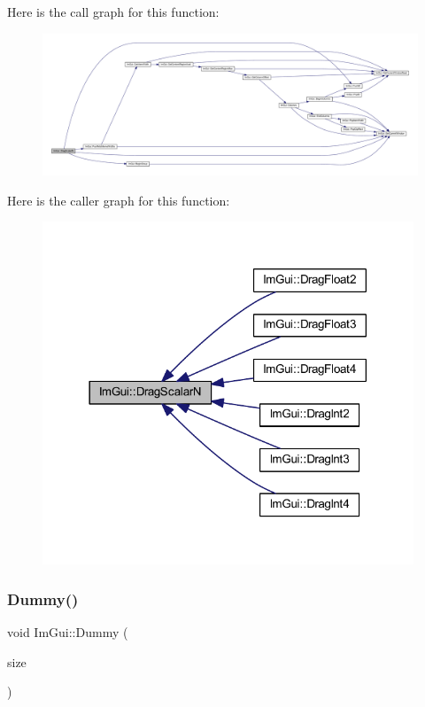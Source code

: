Here is the call graph for this function\+:
\nopagebreak
\begin{figure}[H]
\begin{center}
\leavevmode
\includegraphics[width=350pt]{namespace_im_gui_a8772a7febac2b035d3f2f240f7e7c2e9_cgraph}
\end{center}
\end{figure}
Here is the caller graph for this function\+:
\nopagebreak
\begin{figure}[H]
\begin{center}
\leavevmode
\includegraphics[width=314pt]{namespace_im_gui_a8772a7febac2b035d3f2f240f7e7c2e9_icgraph}
\end{center}
\end{figure}
\mbox{\label{namespace_im_gui_a8b0fb07113251301ff897b8578a53f34}} 
\subsubsection{\texorpdfstring{Dummy()}{Dummy()}}
{\footnotesize\ttfamily void Im\+Gui\+::\+Dummy (\begin{DoxyParamCaption}\item[{const \mbox{\hyperlink{struct_im_vec2}{Im\+Vec2}} \&}]{size }\end{DoxyParamCaption})}

